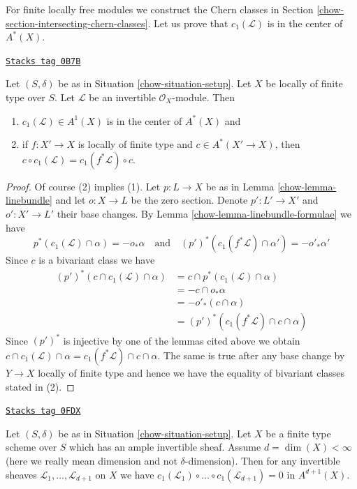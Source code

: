 For finite locally free modules we construct the Chern classes in
Section \ref{chow-section-intersecting-chern-classes}.
Let us prove that $c_1(\mathcal{L})$ is in the center of $A^*(X)$.

\begin{lemma}[C1 center]
\label{chow-lemma-c1-center}
\href{https://stacks.math.columbia.edu/tag/0B7B}{\texttt{Stacks tag 0B7B}}

Let $(S, \delta)$ be as in Situation \ref{chow-situation-setup}.
Let $X$ be locally of finite type over $S$.
Let $\mathcal{L}$ be an invertible $\mathcal{O}_X$-module.
Then
\begin{enumerate}
\item $c_1(\mathcal{L}) \in A^1(X)$ is in the center of $A^*(X)$ and
\item if $f : X' \to X$ is locally of finite type and $c \in A^*(X' \to X)$,
then $c \circ c_1(\mathcal{L}) = c_1(f^*\mathcal{L}) \circ c$.
\end{enumerate}
\end{lemma}

\begin{proof}

Of course (2) implies (1).
Let $p : L \to X$ be as in Lemma \ref{chow-lemma-linebundle} and let $o : X \to L$
be the zero section. Denote $p' : L' \to X'$ and $o' : X' \to L'$
their base changes. By Lemma \ref{chow-lemma-linebundle-formulae} we have
$$
p^*(c_1(\mathcal{L}) \cap \alpha) = - o_* \alpha
\quad\text{and}\quad
(p')^*(c_1(f^*\mathcal{L}) \cap \alpha') = - o'_* \alpha'
$$
Since $c$ is a bivariant class we have
\begin{align*}
(p')^*(c \cap c_1(\mathcal{L}) \cap \alpha)
& =
c \cap p^*(c_1(\mathcal{L}) \cap \alpha) \\
& =
- c \cap o_* \alpha \\
& =
- o'_*(c \cap \alpha) \\
& =
(p')^*(c_1(f^*\mathcal{L}) \cap c \cap \alpha)
\end{align*}
Since $(p')^*$ is injective by one of the lemmas cited above we obtain
$c \cap c_1(\mathcal{L}) \cap \alpha =
c_1(f^*\mathcal{L}) \cap c \cap \alpha$.
The same is true after any base change by $Y \to X$ locally of finite type
and hence we have the equality of bivariant classes stated in (2).
\end{proof}

\begin{lemma}
\label{chow-lemma-vanish-above-dimension}
\href{https://stacks.math.columbia.edu/tag/0FDX}{\texttt{Stacks tag 0FDX}}

Let $(S, \delta)$ be as in Situation \ref{chow-situation-setup}. Let $X$ be a
finite type scheme over $S$ which has an ample invertible sheaf.
Assume $d = \dim(X) < \infty$ (here we really mean dimension and
not $\delta$-dimension).
Then for any invertible sheaves $\mathcal{L}_1, \ldots, \mathcal{L}_{d + 1}$
on $X$ we have
$c_1(\mathcal{L}_1) \circ \ldots \circ c_1(\mathcal{L}_{d + 1}) = 0$
in $A^{d + 1}(X)$.
\end{lemma}

